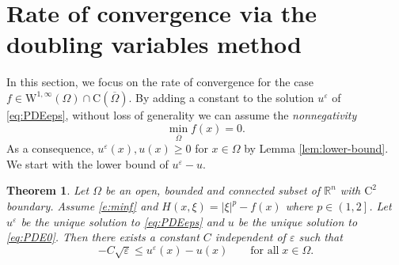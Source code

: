 \documentclass[11pt,reqno]{amsart}
\numberwithin{figure}{section}
\theoremstyle{plain}
\newtheorem{thm}{Theorem}[section]
\theoremstyle{remark}
\numberwithin{equation}{section}
\newcommand{\R}{\mathbb{R}}
\begin{document}
\section{Rate of convergence via the doubling variables method}
In this section, we focus on the rate of convergence for the case $f\in \mathrm{W}^{1,\infty}(\Omega)\cap\mathrm{C}(\overline{\Omega})$. By adding a constant to the solution $u^\varepsilon$ of \eqref{eq:PDEeps}, without loss of generality we can assume the \emph{nonnegativity}
\begin{equation}\label{e:minf}
    \min_{\overline{\Omega}} f(x) = 0.
\end{equation}
As a consequence, $u^\varepsilon(x),u(x)\geq 0$ for $x\in \Omega$ by Lemma \ref{lem:lower-bound}. We start with the lower bound of $u^\varepsilon - u$.
\begin{thm} Let $\Omega$ be an open, bounded and connected subset of $\R^n$ with $\mathrm{C}^2$ boundary. Assume \eqref{e:minf} and $H(x,\xi) = |\xi|^p - f(x)$ where $p\in\left(1,2\right]$. Let $u^\varepsilon$ be the unique solution to \eqref{eq:PDEeps} and $u$ be the unique solution to \eqref{eq:PDE0}. Then there exists a constant $C$ independent of $\varepsilon$ such that
\begin{equation}\label{e:lower1}
    -C\sqrt{\varepsilon} \leq u^\varepsilon(x) - u(x) \qquad\text{for all}\;x\in \Omega.
\end{equation} 
\end{thm}
\end{document}
